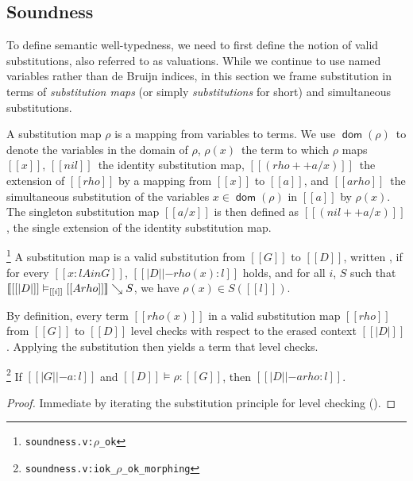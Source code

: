 \documentclass[acmsmall, screen=true, nonacm=true,
  review=\ifpublic false\else true\fi,
  anonymous=\ifanonymous true\else false\fi
]{acmart}
\DeclarePairedDelimiter{\bracks}{\llbracket}{\rrbracket}
\newcommand{\suppl}[3]{{\scriptsize\texttt{#2:#3}}}
\newcommand{\judgement}[1]{{\setlength{\fboxsep}{1.5pt}\fbox{#1}}}
\newcommand{\interp}[4]{\bracks{#1 \vDash_{#2} #3} \searrow #4}
\newcommand{\member}[3]{#1 \in #3(#2)}
\newcommand{\dom}{\mathop{\mathsf{dom}}}
\newcommand{\sws}[3]{#1 \vDash #2 : #3}
\newlength{\punctwidth}
\newcommand{\stack}[1]{%
  \settowidth{\punctwidth}{#1}%
  \hspace*{-\the\punctwidth}%
}
\begin{document}
\subsection{Soundness}
\label{sec:soundness}
To define semantic well-typedness, we need to first define the notion
of valid substitutions, also referred to as valuations.
While we continue to use named variables rather than de Bruijn indices,
in this section we frame substitution in terms of \emph{substitution maps}
(or simply \emph{substitutions} for short)
and simultaneous substitutions.

\begin{definition}
  A substitution map $\rho$ is a mapping from variables to terms.
  We use $\dom(\rho)$~to denote the variables in the domain of $\rho$,
  $\rho(x)$~the term to which $\rho$ maps $[[x]]$,
  $[[nil]]$~the identity substitution map,
  $[[(rho ++ { a / x })]]$~the extension of $[[rho]]$
  by a mapping from $[[x]]$ to $[[a]]$,
  and $[[a { rho }]]$~the simultaneous substitution
  of the variables $x \in \dom(\rho)$ in $[[a]]$ by $\rho(x)$.
  The singleton substitution map $[[{ a / x }]]$
  is then defined as $[[(nil ++ { a / x })]]$,
  the single extension of the identity substitution map.
\end{definition}

\begin{definition}
  \stack{.~}\footnote{\suppl{theories}{soundness.v}{$\rho$\_ok}}
  \label{def:semwf}
  A substitution map is a valid substitution
  from $[[G]]$ to $[[D]]$,
  written \judgement{$\sws{[[D]]}{\rho}{[[G]]}$},
  if for every $[[x : l A in G]]$,
  $[[| D | |- rho(x) : l]]$ holds,
  and for all $i$, $S$ such that
  $\interp{[[|D|]]}{[[i]]}{[[A { rho }]]}{S}$,
  we have $\member{\rho(x)}{[[l]]}{S}$.
\end{definition}

By definition, every term $[[rho(x)]]$ in a valid substitution map
$[[rho]]$ from $[[G]]$ to $[[D]]$ level checks with respect to the erased context
$[[|D|]]$. Applying the substitution then yields a term that level checks.

\begin{lemma}
\stack{.~}\footnote{\suppl{theories}{soundness.v}{iok\_$\rho$\_ok\_morphing}}
  If $[[|G| |- a : l]]$ and $\sws{[[D]]}{\rho}{[[G]]}$, then $[[|D| |-
  a{rho} : l ]]$.
\end{lemma}

\begin{proof}
  Immediate by iterating the substitution principle for level checking ().
\end{proof}
\end{document}
